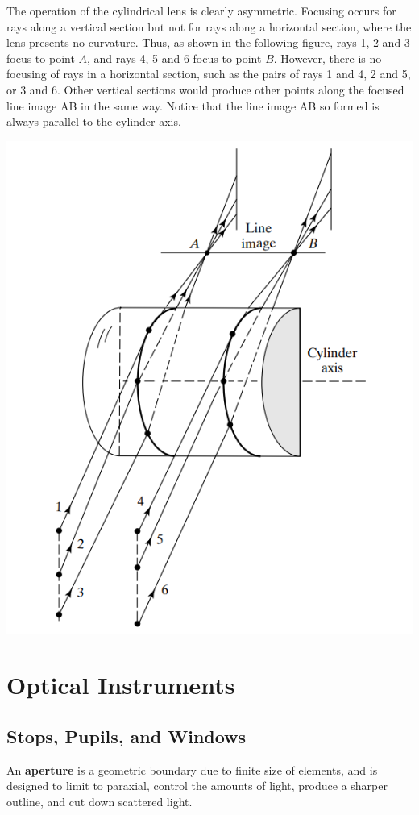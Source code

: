 \documentclass[11pt]{book}
\theoremstyle{break}
\theoremstyle{break}
\begin{document}
The operation of the cylindrical lens is clearly asymmetric. Focusing occurs for rays along a vertical section but not for rays along a horizontal section, where the lens presents no curvature. Thus, as shown in the following figure, rays 1, 2 and 3 focus to point $A$, and rays 4, 5 and 6 focus to point $B$. However, there is no focusing of rays in a horizontal section, such as the pairs of rays 1 and 4, 2 and 5, or 3 and 6. Other vertical sections would produce other points along the focused line image AB in the same way. Notice that the line image AB so formed is always parallel to the cylinder axis.
\begin{center}
\includegraphics[scale=0.69]{cylinSym1.png}
\end{center}



\newpage
\chapter{Optical Instruments}
\setcounter{section}{5}
\section[Stops, Pupils, and Windows]{\color{red} Stops, Pupils, and Windows\color{black}}
An \textbf{aperture} is a geometric boundary due to finite size of elements, and is designed to limit to paraxial, control the amounts of light, produce a sharper outline, and cut down scattered light.\\
\end{document}

